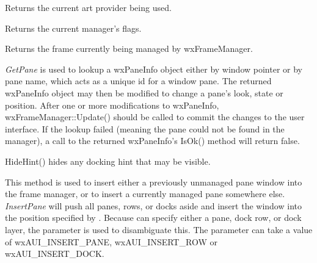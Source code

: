 
Returns the current art provider being used.

\label{wxframemanagergetflags}


Returns the current manager's flags.

\label{wxframemanagergetmanagedwindow}


Returns the frame currently being managed by wxFrameManager.

\label{wxframemanagergetpane}



{\it GetPane} is used to lookup a wxPaneInfo object
either by window pointer or by pane name, which acts as a unique id for
a window pane. The returned wxPaneInfo object may then be modified to
change a pane's look, state or position. After one or more
modifications to wxPaneInfo, wxFrameManager::Update() should be called
to commit the changes to the user interface. If the lookup failed
(meaning the pane could not be found in the manager), a call to the
returned wxPaneInfo's IsOk() method will return false.

\label{wxframemanagerhidehint}


HideHint() hides any docking hint that may be visible.

\label{wxframemanagerinsertpane}


This method is used to insert either a previously unmanaged pane window
into the frame manager, or to insert a currently managed pane somewhere 
else. {\it InsertPane} will push all panes, rows, or docks aside and
insert the window into the position specified by . 
Because  can specify either a pane, dock row, or dock
layer, the  parameter is used to disambiguate this. The
parameter  can take a value of wxAUI\_INSERT\_PANE, wxAUI\_INSERT\_ROW 
or wxAUI\_INSERT\_DOCK.

